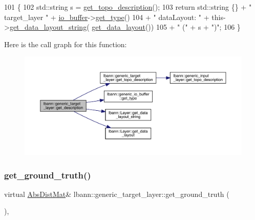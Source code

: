 \begin{DoxyCode}
101                                              \{
102     std::string s = \hyperlink{classlbann_1_1generic__target__layer_ad6ea9a43254664c75aa06e8e5c1d7e8c}{get\_topo\_description}();
103     \textcolor{keywordflow}{return} std::string \{\} + \textcolor{stringliteral}{" target\_layer "} + \hyperlink{classlbann_1_1generic__target__layer_a8da650b94f50cc63fc90cd792fa50c3f}{io\_buffer}->\hyperlink{classlbann_1_1generic__io__buffer_adc77c0a280f8a200a8d8495c3a371ebb}{get\_type}()
104            + \textcolor{stringliteral}{" dataLayout: "} + this->\hyperlink{classlbann_1_1Layer_ae3f4a5602df821f4221614b1e3782dc1}{get\_data\_layout\_string}(
      \hyperlink{classlbann_1_1Layer_a5dfb66e81fc085997402a5e2241316bd}{get\_data\_layout}())
105            + \textcolor{stringliteral}{" ("} + s + \textcolor{stringliteral}{")"};
106   \}
\end{DoxyCode}
Here is the call graph for this function\+:\nopagebreak
\begin{figure}[H]
\begin{center}
\leavevmode
\includegraphics[width=350pt]{classlbann_1_1generic__target__layer_aa2db5ccc0bbd40f081c8ff4501f3fc29_cgraph}
\end{center}
\end{figure}
\mbox{\label{classlbann_1_1generic__target__layer_a9cbe476f3e447bc91e2834921ca7da9f}} 
\subsubsection{\texorpdfstring{get\+\_\+ground\+\_\+truth()}{get\_ground\_truth()}\hspace{0.1cm}{\footnotesize\ttfamily [1/2]}}
{\footnotesize\ttfamily virtual \hyperlink{base_8hpp_a9a697a504ae84010e7439ffec862b470}{Abs\+Dist\+Mat}\& lbann\+::generic\+\_\+target\+\_\+layer\+::get\+\_\+ground\+\_\+truth (\begin{DoxyParamCaption}{ }\end{DoxyParamCaption})\hspace{0.3cm}{\ttfamily [inline]}, {\ttfamily [virtual]}}



